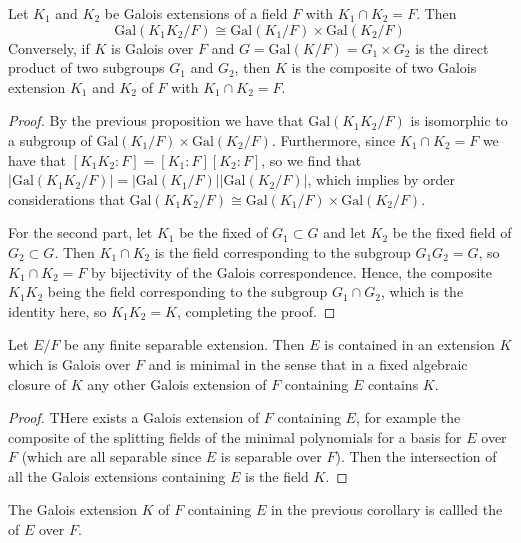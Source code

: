 \documentclass[12pt, a4paper, oneside, openright, titlepage]{book}
\begin{document}
\begin{cor}
    Let $K_1$ and $K_2$ be Galois extensions of a field $F$ with $K_1\cap K_2 = F$. Then \begin{equation*}
        \text{Gal}(K_1K_2/F)\cong \text{Gal}(K_1/F)\times \text{Gal}(K_2/F)
    \end{equation*}
    Conversely, if $K$ is Galois over $F$ and $G = \text{Gal}(K/F) = G_1\times G_2$ is the direct product of two subgroups $G_1$ and $G_2$, then $K$ is the composite of two Galois extension $K_1$ and $K_2$ of $F$ with $K_1\cap K_2 = F$.
\end{cor}
\begin{proof}
    By the previous proposition we have that $\text{Gal}(K_1K_2/F)$ is isomorphic to a subgroup of $\text{Gal}(K_1/F)\times \text{Gal}(K_2/F)$. Furthermore, since $K_1 \cap K_2 = F$ we have that $[K_1K_2:F] = [K_1:F][K_2:F]$, so we find that $|\text{Gal}(K_1K_2/F)| = |\text{Gal}(K_1/F)||\text{Gal}(K_2/F)|$, which implies by order considerations that $\text{Gal}(K_1K_2/F)\cong \text{Gal}(K_1/F)\times \text{Gal}(K_2/F)$.

    For the second part, let $K_1$ be the fixed of $G_1 \subset G$ and let $K_2$ be the fixed field of $G_2 \subset G$. Then $K_1\cap K_2$ is the field corresponding to the subgroup $G_1G_2 = G$, so $K_1\cap K_2 = F$ by bijectivity of the Galois correspondence. Hence, the composite $K_1K_2$ being the field corresponding to the subgroup $G_1\cap G_2$, which is the identity here, so $K_1K_2 = K$, completing the proof.
\end{proof}


\begin{cor}
    Let $E/F$ be any finite separable extension. Then $E$ is contained in an extension $K$ which is Galois over $F$ and is minimal in the sense that in a fixed algebraic closure of $K$ any other Galois extension of $F$ containing $E$ contains $K$.
\end{cor}
\begin{proof}
    THere exists a Galois extension of $F$ containing $E$, for example the composite of the splitting fields of the minimal polynomials for a basis for $E$ over $F$ (which are all separable since $E$ is separable over $F$). Then the intersection of all the Galois extensions containing $E$ is the field $K$.
\end{proof}

\begin{defn}
    The Galois extension $K$ of $F$ containing $E$ in the previous corollary is callled the  of $E$ over $F$.
\end{defn}
\end{document}
